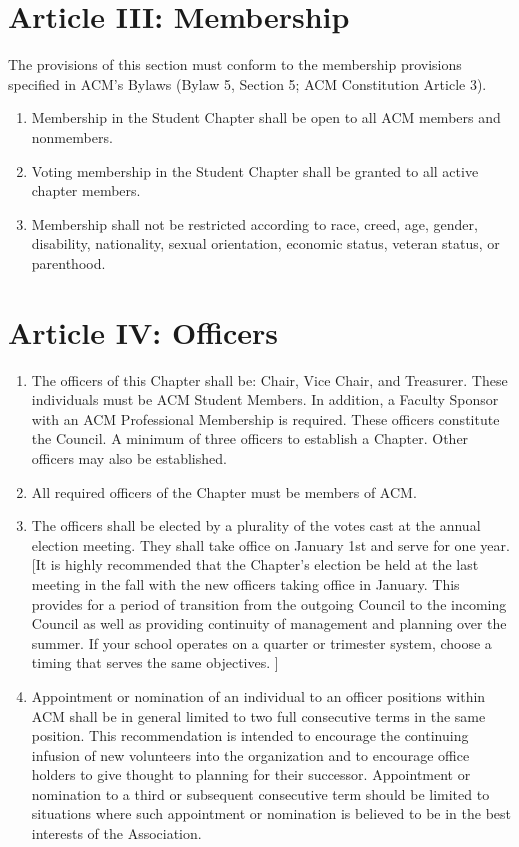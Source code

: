 \section*{Article III: Membership}

The provisions of this section must conform to the membership provisions specified in ACM's Bylaws (Bylaw 5, Section 5; ACM Constitution Article 3).
 
\begin{enumerate}
	\item Membership in the Student Chapter shall be open to all ACM members and nonmembers.
	\item Voting membership in the Student Chapter shall be granted to all active chapter members.
	\item Membership shall not be restricted according to race, creed, age, gender, disability, nationality, sexual orientation, economic status, veteran status, or parenthood.
\end{enumerate}


\section*{Article IV: Officers}
\begin{enumerate}
	\item The officers of this Chapter shall be: Chair, Vice Chair, and Treasurer. These individuals must be ACM Student Members. In addition, a Faculty Sponsor with an ACM Professional Membership is required. These officers constitute the Council. A minimum of three officers to establish a Chapter. Other officers may also be established.
	\item All required officers of the Chapter must be members of ACM.
	\item The officers shall be elected by a plurality of the votes cast at the annual election meeting. They shall take office on January 1st and serve for one year. [It is highly recommended that the Chapter's election be held at the last meeting in the fall with the new officers taking office in January. This provides for a period of transition from the outgoing Council to the incoming Council as well as providing continuity of management and planning over the summer. If your school operates on a quarter or trimester system, choose a timing that serves the same objectives. ]
	\item Appointment or nomination of an individual to an officer positions within ACM shall be in general limited to two full consecutive terms in the same position.  This recommendation is intended to encourage the continuing infusion of new volunteers into the organization and to encourage office holders to give thought to planning for their successor.  Appointment or nomination to a third or subsequent consecutive term should be limited to situations where such appointment or nomination is believed to be in the best interests of the Association.
\end{enumerate}

